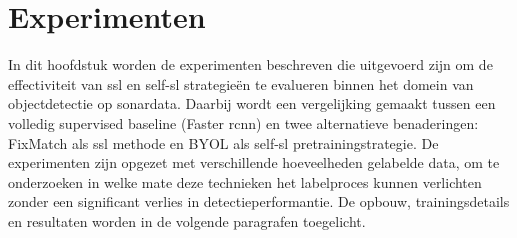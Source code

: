 \chapter{Experimenten}
\label{ch:experimenten}

In dit hoofdstuk worden de experimenten beschreven die uitgevoerd zijn om de effectiviteit van \gls{ssl} en \gls{self-sl} strategieën te evalueren binnen het domein van objectdetectie op sonardata. Daarbij wordt een vergelijking gemaakt tussen een volledig supervised baseline (Faster \gls{rcnn}) en twee alternatieve benaderingen: FixMatch als \gls{ssl} methode en BYOL als \gls{self-sl} pretrainingstrategie. De experimenten zijn opgezet met verschillende hoeveelheden gelabelde data, om te onderzoeken in welke mate deze technieken het labelproces kunnen verlichten zonder een significant verlies in detectieperformantie. De opbouw, trainingsdetails en resultaten worden in de volgende paragrafen toegelicht.








